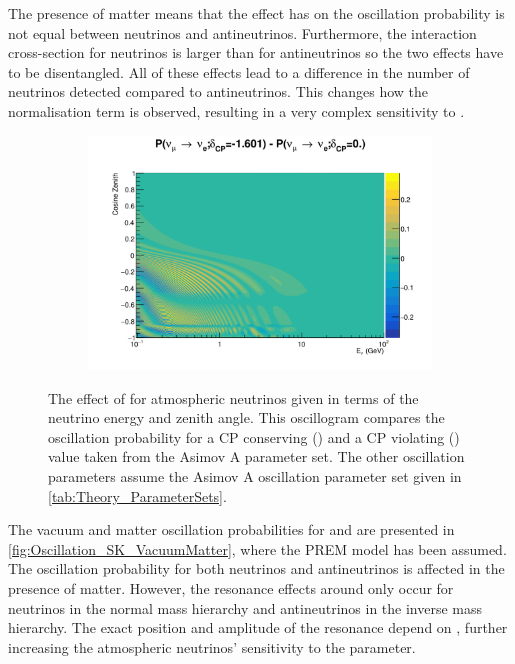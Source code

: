 The presence of matter means that the effect  has on the oscillation probability is not equal between neutrinos and antineutrinos. Furthermore, the interaction cross-section for neutrinos is larger than for antineutrinos so the two effects have to be disentangled.
All of these effects lead to a difference in the number of neutrinos detected compared to antineutrinos. This changes how the  normalisation term is observed, resulting in a very complex sensitivity to .

\begin{figure}[h]
  \begin{subfigure}[t]{\textwidth}
    \includegraphics[width=\textwidth, trim={0mm 0mm 0mm 0mm}, clip,page=1]{Figures/Oscillation/AtmDCPSens.pdf}
  \end{subfigure}
  \caption{The effect of  for atmospheric neutrinos given in terms of the neutrino energy and zenith angle. This oscillogram compares the  oscillation probability for a CP conserving () and a CP violating () value taken from the Asimov A parameter set. The other oscillation parameters assume the Asimov A oscillation parameter set given in \autoref{tab:Theory_ParameterSets}.}
  \label{fig:Oscillation_SK_DCPSensitivity}
\end{figure}

The vacuum and matter oscillation probabilities for  and  are presented in \autoref{fig:Oscillation_SK_VacuumMatter}, where the PREM model has been assumed. The oscillation probability for both neutrinos and antineutrinos is affected in the presence of matter. However, the resonance effects around  only occur for neutrinos in the normal mass hierarchy and antineutrinos in the inverse mass hierarchy. The exact position and amplitude of the resonance depend on , further increasing the atmospheric neutrinos' sensitivity to the parameter.

